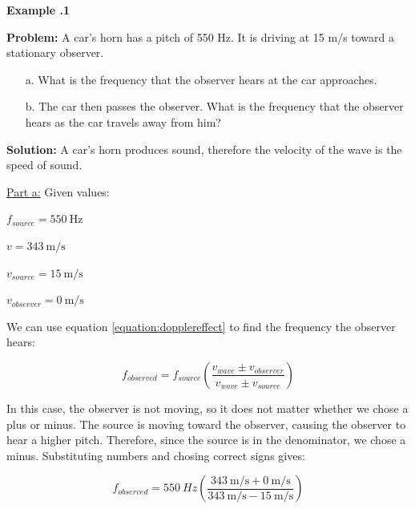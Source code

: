 	
	\begin{mdframed}[backgroundcolor=blue!10!white]
	\begin{center}
		
		
		\textbf{Example \thesection.1}	
	\end{center}
	
	\textbf{Problem: } A car's horn has a pitch of 550 Hz.  It is driving at 15 m/s toward a stationary observer.  \begin{enumerate}
		\item[a.] What is the frequency that the observer hears at the car approaches. 
		\item[b.] The car then passes the observer.  What is the frequency that the observer hears as the car travels away from him?  
		
	\end{enumerate}
	
	\vspace{0.1in}
	
	\textbf{Solution:} A car's horn produces sound, therefore the velocity of the wave is the speed of sound. 
  
	\underline{Part a:} Given values:  \begin{center}
		$f_{source} = \SI{550}{\Hz}$
		
		$v = \SI[per-mode = symbol]{343}{\m\per\s} $
		
		$v_{source} = \SI[per-mode = symbol]{15}{\m\per\s} $
		
		$v_{observer} = \SI[per-mode = symbol]{0}{\m\per\s} $
	\end{center}
	
	We can use equation \ref{equation:dopplereffect} to find the frequency the observer hears:

	\begin{equation*}
			f_{observed} = f_{source}(\frac{v_{wave} \pm v_{observer}}{v_{wave} \pm v_{source}})
	\end{equation*}
	
	In this case, the observer is not moving, so it does not matter whether we chose a plus or minus.  The source is moving toward the observer, causing the observer to hear a higher pitch.  Therefore, since the source is in the denominator, we chose a minus.  Substituting numbers and chosing correct signs gives:
	
	\begin{equation*}
	f_{observed} = \SI{550}{Hz}(\frac{\SI[per-mode = symbol]{343}{\m\per\s} + \SI[per-mode = symbol]{0}{\m\per\s}}{{\SI[per-mode = symbol]{343}{\m\per\s} - \SI[per-mode = symbol]{15}{\m\per\s}}})
	\end{equation*}
	

\end{mdframed}
